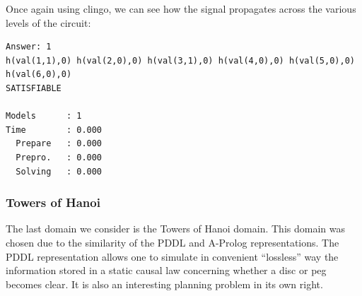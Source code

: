 \documentclass{article}
\begin{document}
\noindent Once again using clingo, we can see how the signal propagates across the various levels of the circuit:
\begin{verbatim}
Answer: 1
h(val(1,1),0) h(val(2,0),0) h(val(3,1),0) h(val(4,0),0) h(val(5,0),0) h(val(6,0),0) 
SATISFIABLE

Models      : 1     
Time        : 0.000
  Prepare   : 0.000
  Prepro.   : 0.000
  Solving   : 0.000
\end{verbatim}

\subsubsection{Towers of Hanoi}

The last domain we consider is the Towers of Hanoi domain. This domain was chosen due to the similarity of the PDDL and A-Prolog representations. The PDDL representation allows one to simulate in convenient ``lossless'' way the information stored in a static causal law concerning whether a disc or peg becomes clear. It is also an interesting planning problem in its own right.
\end{document}
